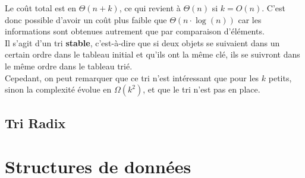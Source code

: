 \documentclass[12pt,a4paper]{book}
\begin{document}
Le coût total est en $\Theta(n+k)$, ce qui revient à $\Theta(n)$ si $k = O(n)$. C'est donc possible d'avoir un coût plus faible que $\Theta(n\cdot\log(n))$ car les informations sont obtenues autrement que par comparaison d'éléments. \\

Il s'agit d'un tri \textbf{stable}, c'est-à-dire que si deux objets se suivaient dans un certain ordre dans le tableau initial et qu'ils ont la même clé, ils se suivront dans le même ordre dans le tableau trié. \\


Cepedant, on peut remarquer que ce tri n'est intéressant que pour les $k$ petits, sinon la complexité évolue en $\Omega(k^2)$, et que le tri n'est pas en place.

\section{Tri Radix}

\chapter{Structures de données}
\end{document}
